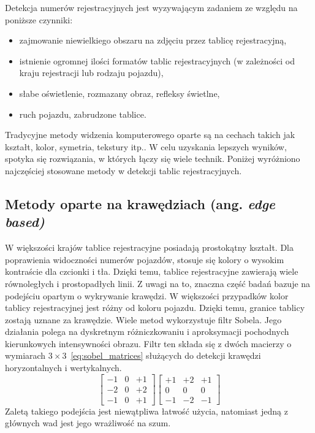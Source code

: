Detekcja numerów rejestracyjnych jest wyzywającym zadaniem ze względu na poniższe czynniki:
\begin{itemize}
    \item zajmowanie niewielkiego obszaru na zdjęciu przez tablicę rejestracyjną,
    \item istnienie ogromnej ilości formatów tablic rejestracyjnych (w zależności od kraju rejestracji lub rodzaju pojazdu),
    \item słabe oświetlenie, rozmazany obraz, refleksy świetlne,
    \item ruch pojazdu, zabrudzone tablice.
\end{itemize}
Tradycyjne metody widzenia komputerowego oparte są na cechach takich jak kształt, kolor, symetria, tekstury itp.\cite{9310202}.
W celu uzyskania lepszych wyników, spotyka się rozwiązania, w których łączy się wiele technik.
Poniżej wyróżniono najczęściej stosowane metody w detekcji tablic rejestracyjnych.

\subsection{Metody oparte na krawędziach (ang. \textit{edge based)}}
\label{subsec:edge-based}
W większości krajów tablice rejestracyjne posiadają prostokątny kształt.
Dla poprawienia widoczności numerów pojazdów, stosuje się kolory o wysokim kontraście dla czcionki i tła.
Dzięki temu, tablice rejestracyjne zawierają wiele równoległych i prostopadłych linii.
Z uwagi na to, znaczna część badań bazuje na podejściu opartym o wykrywanie krawędzi.
W większości przypadków kolor tablicy rejestracyjnej jest różny od koloru pojazdu.
Dzięki temu, granice tablicy zostają uznane za krawędzie.
Wiele metod wykorzystuje filtr Sobela.
Jego działania polega na dyskretnym różniczkowaniu i aproksymacji pochodnych kierunkowych intensywności obrazu.
Filtr ten składa się z dwóch macierzy o wymiarach $3\times3$~\eqref{eq:sobel_matrices} służących do detekcji krawędzi horyzontalnych i wertykalnych.
\begin{equation}
    \begin{bmatrix}
        -1 & 0 & +1 \\
        -2 & 0 & +2 \\
        -1 & 0 & +1
    \end{bmatrix}
%
    \begin{bmatrix}
        +1 & +2 & +1 \\
        0  & 0  & 0  \\
        -1 & -2 & -1
    \end{bmatrix}
    \label{eq:sobel_matrices}
\end{equation}
Zaletą takiego podejścia jest niewątpliwa łatwość użycia, natomiast jedną z głównych wad jest jego wrażliwość na szum.

